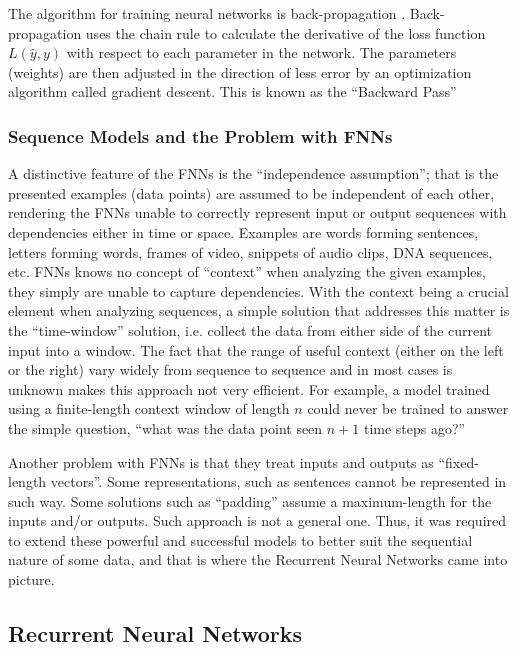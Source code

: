 The algorithm for training neural networks is back-propagation \cite{rumelhart1985learning}. Back-propagation uses the chain rule to calculate the derivative of the loss function $L(\widehat{y}, y)$ with respect to each parameter in the network. The parameters (weights) are then adjusted in the direction of less error by an optimization algorithm called gradient descent. This is known as the \enquote{Backward Pass}

\subsubsection{Sequence Models and the Problem with \ac{FNN}s}
\label{bg:s2_sub1_subsub1}

A distinctive feature of the \ac{FNN}s is the \enquote{independence assumption}; that is the presented examples (data points) are assumed to be independent of each other, rendering the \ac{FNN}s unable to correctly represent input or output sequences with dependencies either in time or space. Examples are words forming sentences, letters forming words, frames of video, snippets of audio clips, DNA sequences, etc. \ac{FNN}s knows no concept of “context” when analyzing the given examples, they simply are unable to capture dependencies. With the context being a crucial element when analyzing sequences, a simple solution that addresses this matter is the \enquote{time-window} solution, i.e. collect the data from either side of the current input into a window. The fact that the range of useful context (either on the left or the right) vary widely from sequence to sequence and in most cases is unknown makes this approach not very efficient.
For example, a model trained using a finite-length context window of length $n$ could never be trained to answer the simple question, \enquote{what was the data point seen $n+\mathrm{1}$ time steps ago?}


Another problem with \ac{FNN}s is that they treat inputs and outputs as \enquote{fixed-length vectors}. Some representations, such as sentences cannot be represented in such way. Some  solutions such as \enquote{padding} assume a maximum-length for the inputs and/or outputs. Such approach is not a general one. 
Thus, it was required to extend these powerful and successful models to better suit the sequential nature of some data, and that is where the Recurrent Neural Networks came into picture.


\subsection{Recurrent Neural Networks} 
\label{bg:s2_sub2}

